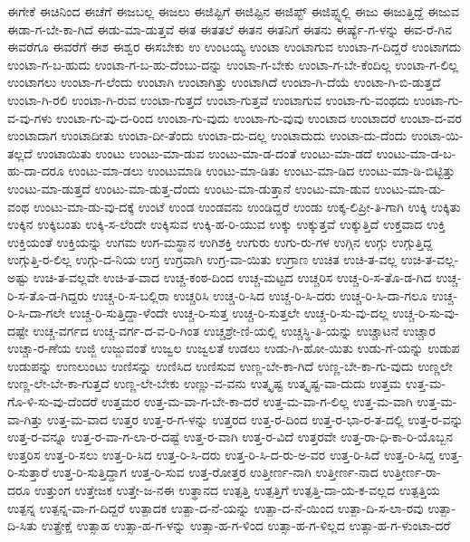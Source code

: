 {ಈಗೇಕೆ
ಈಚಿನಿಂದ
ಈಚೆಗೆ
ಈಜಬಲ್ಲ
ಈಜಲು
ಈಜಿಪ್ಟಿಗೆ
ಈಜಿಪ್ಟಿನ
ಈಜಿಪ್ಟ್
ಈಜಿಪ್ಟ್ನಲ್ಲಿ
ಈಜು
ಈಜುತ್ತಿದ್ದೆ
ಈಜುವ
ಈಡಾ-ಗ-ಬೇ-ಕಾ-ಗಿದೆ
ಈಡು-ಮಾ-ಡುತ್ತವೆ
ಈತ
ಈತತಲೆ
ಈತನ
ಈತನಿಗೆ
ಈತನು
ಈರ್ಷ್ಯೆ-ಗ-ಳನ್ನು
ಈವ-ರೆ-ಗಿನ
ಈವರೆಗೂ
ಈವರೆಗೆ
ಈಶ
ಈಶ್ವರ
ಈಸಬೇಕು
ಉ
ಉಂಟಯ್ಯ
ಉಂಟಾ
ಉಂಟಾಗುವ
ಉಂಟಾ-ಗ-ದಿದ್ದರೆ
ಉಂಟಾಗದು
ಉಂಟಾ-ಗ-ಬ-ಹುದು
ಉಂಟಾ-ಗ-ಬ-ಹು-ದೆಂಬು-ದನ್ನು
ಉಂಟಾ-ಗ-ಬೇಕು
ಉಂಟಾ-ಗ-ಬೇ-ಕೆಂದಿಲ್ಲ
ಉಂಟಾ-ಗ-ಲಿಲ್ಲ
ಉಂಟಾಗಲು
ಉಂಟಾ-ಗ-ಲೆಂದು
ಉಂಟಾಗಿ
ಉಂಟಾಗಿತ್ತು
ಉಂಟಾಗಿದೆ
ಉಂಟಾ-ಗಿ-ದೆಯೆ
ಉಂಟಾ-ಗಿ-ಬಿ-ಡುತ್ತದೆ
ಉಂಟಾ-ಗಿ-ರಲಿ
ಉಂಟಾ-ಗಿ-ರುವ
ಉಂಟಾ-ಗುತ್ತದೆ
ಉಂಟಾ-ಗುತ್ತವೆ
ಉಂಟಾಗುವ
ಉಂಟಾ-ಗು-ವಂಥದು
ಉಂಟಾ-ಗು-ವ-ವು-ಗಳು
ಉಂಟಾ-ಗು-ವು-ದ-ರಿಂದ
ಉಂಟಾ-ಗು-ವುದು
ಉಂಟಾ-ಗು-ವುವು
ಉಂಟಾದ
ಉಂಟಾದರೆ
ಉಂಟಾ-ದ-ವರ
ಉಂಟಾದಾಗ
ಉಂಟಾದೀತು
ಉಂಟಾ-ದೀ-ತೆಂದು
ಉಂಟಾ-ದು-ದಲ್ಲ
ಉಂಟಾದುದು
ಉಂಟಾ-ದು-ದೆಂದು
ಉಂಟಾ-ಯಿ-ತಲ್ಲದೆ
ಉಂಟಾಯಿತು
ಉಂಟು
ಉಂಟು-ಮಾ-ಡುವ
ಉಂಟು-ಮಾ-ಡ-ದಂತೆ
ಉಂಟು-ಮಾ-ಡದೆ
ಉಂಟು-ಮಾ-ಡ-ಬ-ಹು-ದಾ-ದರೂ
ಉಂಟು-ಮಾ-ಡಲು
ಉಂಟುಮಾಡಿ
ಉಂಟು-ಮಾ-ಡಿತು
ಉಂಟು-ಮಾ-ಡಿದ
ಉಂಟು-ಮಾ-ಡಿ-ಬಿಟ್ಟಿತ್ತು
ಉಂಟು-ಮಾ-ಡುತ್ತದೆ
ಉಂಟು-ಮಾ-ಡುತ್ತ-ದೆಂದು
ಉಂಟು-ಮಾ-ಡುತ್ತಾನೆ
ಉಂಟು-ಮಾ-ಡುವ
ಉಂಟು-ಮಾ-ಡು-ವಂಥ
ಉಂಟು-ಮಾ-ಡು-ವು-ದಕ್ಕೆ
ಉಂಟೆ
ಉಂಡ
ಉಂಡವನು
ಉಂಡಿದ್ದರೆ
ಉಂಡು
ಉಕ್ಕ-ಲಿಪ್ರೀ-ತಿ-ಗಾಗಿ
ಉಕ್ಕಿ
ಉಕ್ಕಿತು
ಉಕ್ಕಿನ
ಉಕ್ಕಿಬಂತು
ಉಕ್ಕಿ-ಸ-ಲೆಂದೇ
ಉಕ್ಕಿಸುವ
ಉಕ್ಕಿ-ಹ-ರಿ-ಯುವ
ಉಕ್ಕು
ಉಕ್ಕುತ್ತವೆ
ಉಕ್ಕುತ್ತಿದೆ
ಉಕ್ತವಾದ
ಉಕ್ತಿ
ಉಕ್ತಿಯಂತೆ
ಉಕ್ತಿಯನ್ನು
ಉಗಮ
ಉಗ-ಮಸ್ಥಾನ
ಉಗಿಶಕ್ತಿ
ಉಗುರು
ಉಗು-ರು-ಗಳ
ಉಗ್ಗಿನ
ಉಗ್ಗು
ಉಗ್ಗುತ್ತಿದ್ದ
ಉಗ್ಗುತ್ತಿ-ರ-ಲಿಲ್ಲ
ಉಗ್ಗು-ದ-ನಿಯ
ಉಗ್ರ
ಉಗ್ರವಾಗಿ
ಉಗ್ರ-ವಾ-ಯಿತು
ಉಗ್ರಾಣ
ಉಚಿತ
ಉಚಿ-ತ-ವಲ್ಲ
ಉಚಿ-ತ-ವಲ್ಲ-ಅಷ್ಟು
ಉಚಿ-ತ-ವಲ್ಲವೇ
ಉಚಿ-ತ-ವಾದ
ಉಚ್ಚ-ಕಂಠ-ದಿಂದ
ಉಚ್ಚ-ಮಟ್ಟದ
ಉಚ್ಚರಿಸ
ಉಚ್ಚ-ರಿ-ಸ-ತೊ-ಡ-ಗಿದ
ಉಚ್ಚ-ರಿ-ಸ-ತೊ-ಡ-ಗಿದ್ದರು
ಉಚ್ಚ-ರಿ-ಸ-ಬಲ್ಲಿರಾ
ಉಚ್ಚರಿಸಿ
ಉಚ್ಚ-ರಿ-ಸಿದ
ಉಚ್ಚ-ರಿ-ಸಿ-ದರು
ಉಚ್ಚ-ರಿ-ಸಿ-ದಾ-ಗಲೂ
ಉಚ್ಚ-ರಿ-ಸಿ-ದಾ-ಗಲೇ
ಉಚ್ಚ-ರಿ-ಸುತ್ತಿದ್ದಾ-ಳೆಂದೇ
ಉಚ್ಚ-ರಿ-ಸುತ್ತ
ಉಚ್ಚ-ರಿ-ಸುತ್ತಲೇ
ಉಚ್ಚ-ರಿ-ಸು-ವು-ದಲ್ಲ
ಉಚ್ಚ-ರಿ-ಸು-ವು-ದಷ್ಟೇ
ಉಚ್ಚ-ವರ್ಗದ
ಉಚ್ಚ-ವರ್ಗ-ದ-ವ-ರಿ-ಗಿಂತ
ಉಚ್ಚಶ್ರೇ-ಣಿ-ಯಲ್ಲಿ
ಉಚ್ಚಸ್ಥಿ-ತಿ-ಯನ್ನು
ಉಚ್ಚಾಟನೆ
ಉಚ್ಚಾರ
ಉಚ್ಚಾ-ರ-ಣೆಯ
ಉಜ್ಜಿ
ಉಜ್ಜುವಂತೆ
ಉಜ್ವಲ
ಉಜ್ವಲತೆ
ಉಡಲು
ಉಡು-ಗಿ-ಹೋ-ಯಿತು
ಉಡು-ಗೆ-ಯನ್ನು
ಉಡುಪ
ಉಡುಪನ್ನು
ಉಣಲುಂಟು
ಉಣಿಸನ್ನು
ಉಣಿಸಿದ
ಉಣಿಸುವ
ಉಣ್ಣ-ಬೇ-ಕಾ-ಗಿದೆ
ಉಣ್ಣ-ಬೇ-ಕಾ-ಗು-ವುದು
ಉಣ್ಣಲೇ
ಉಣ್ಣ-ಲೇ-ಬೇ-ಕಾ-ಗುತ್ತದೆ
ಉಣ್ಣ-ಲೇ-ಬೇಕು
ಉಣ್ಣು-ವ-ವನು
ಉತ್ಕೃಷ್ಟ
ಉತ್ಕೃಷ್ಟ-ವಾ-ದುದು
ಉತ್ತಮ
ಉತ್ತ-ಮ-ಗೊ-ಳಿ-ಸು-ವು-ದೆಂದರೆ
ಉತ್ತಮರ
ಉತ್ತ-ಮ-ವಾ-ಗ-ಬೇ-ಕಾ-ದರೆ
ಉತ್ತ-ಮ-ವಾ-ಗ-ಲಿಲ್ಲ
ಉತ್ತ-ಮ-ವಾಗಿ
ಉತ್ತ-ಮ-ವಾ-ಗಿತ್ತು
ಉತ್ತ-ಮ-ವಾದ
ಉತ್ತರ
ಉತ್ತ-ರ-ಗ-ಳನ್ನು
ಉತ್ತರದ
ಉತ್ತ-ರ-ದಿಂದ
ಉತ್ತ-ರ-ಭಾ-ರ-ತ-ದಲ್ಲಿ
ಉತ್ತ-ರ-ವನ್ನು
ಉತ್ತ-ರ-ವನ್ನೂ
ಉತ್ತ-ರ-ವಾ-ಗ-ಲಾ-ರ-ದಷ್ಟೆ
ಉತ್ತ-ರ-ವಾಗಿ
ಉತ್ತ-ರ-ವಿದೆ
ಉತ್ತರವೇ
ಉತ್ತ-ರಾ-ಧಿ-ಕಾ-ರಿ-ಯೊಬ್ಬನ
ಉತ್ತರಿಸ
ಉತ್ತ-ರಿ-ಸಲು
ಉತ್ತ-ರಿ-ಸಿದ
ಉತ್ತ-ರಿ-ಸಿ-ದರು
ಉತ್ತ-ರಿ-ಸಿ-ದ-ರು-ಅ-ವರ
ಉತ್ತ-ರಿ-ಸಿದೆ
ಉತ್ತ-ರಿ-ಸಿದ್ದ
ಉತ್ತ-ರಿ-ಸುತ್ತಾರೆ
ಉತ್ತ-ರಿ-ಸುತ್ತಿದ್ದಾಗ
ಉತ್ತ-ರಿ-ಸುವ
ಉತ್ತ-ರೋತ್ತರ
ಉತ್ತೀರ್ಣ-ನಾಗಿ
ಉತ್ತೀರ್ಣ-ನಾದ
ಉತ್ತೀರ್ಣ-ರಾ-ದರೂ
ಉತ್ತುಂಗ
ಉತ್ತೇಜಕ
ಉತ್ತೇ-ಜ-ನಈ
ಉತ್ಥಾನದ
ಉತ್ಪತ್ತಿ
ಉತ್ಪತ್ತಿಗೆ
ಉತ್ಪತ್ತಿ-ದಾ-ಯ-ಕ-ವಲ್ಲದ
ಉತ್ಪತ್ತಿಯ
ಉತ್ಪನ್ನ
ಉತ್ಪನ್ನ-ವಾ-ಗ-ದಿದ್ದರೆ
ಉತ್ಪಾದಕ
ಉತ್ಪಾ-ದ-ನೆ-ಯನ್ನು
ಉತ್ಪಾ-ದ-ನೆ-ಯಿಂದ
ಉತ್ಪಾ-ದಿ-ಸ-ಲಾ-ರವು
ಉತ್ಪಾ-ದಿ-ಸಿತು
ಉತ್ಪ್ರೇಕ್ಷೆ
ಉತ್ಸಾಹ
ಉತ್ಸಾ-ಹ-ಗ-ಳನ್ನು
ಉತ್ಸಾ-ಹ-ಗ-ಳಿಂದ
ಉತ್ಸಾ-ಹ-ಗ-ಳಿಲ್ಲದ
ಉತ್ಸಾ-ಹ-ಗ-ಳುಂಟಾ-ದರೆ
}
